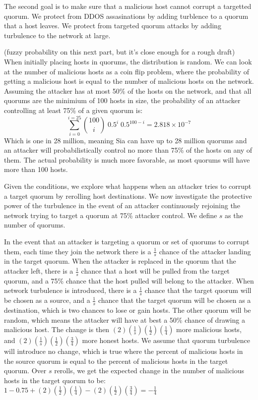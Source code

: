 \documentclass[twocolumn]{article}
\begin{document}
The second goal is to make sure that a malicious host cannot corrupt a targetted quorum.
We protect from DDOS assasinations by adding turblence to a quorum that a host leaves.
We protect from targeted quorum attacks by adding turbulence to the network at large.

(fuzzy probability on this next part, but it's close enough for a rough draft)
When initially placing hosts in quorums, the distribution is random.
We can look at the number of malicious hosts as a coin flip problem, where the probability of getting a malicious host is equal to the number of malicious hosts on the network.
Assuming the attacker has at most 50\% of the hosts on the network, and that all quorums are the minimium of 100 hosts in size, the probability of an attacker controlling at least 75\% of a given quorum is:
\begin{equation}
\sum_{i=0}^{i=25} {100 \choose i} \; 0.5^{i} \; 0.5^{100-i} = 2.818\times10^{-7}
\end{equation}
Which is one in 28 million, meaning Sia can have up to 28 million quorums and an attacker will probabilistically control no more than 75\% of the hosts on any of them.
The actual probability is much more favorable, as most quorums will have more than 100 hosts.

Given the conditions, we explore what happens when an attacker tries to corrupt a target quorum by rerolling host destinations.
We now investigate the protective power of the turbulence in the event of an attacker continuously rejoining the network trying to target a quorum at 75\% attacker control.
We define $s$ as the number of quorums.

In the event that an attacker is targeting a quorum or set of quorums to corrupt them, each time they join the network there is a $\frac{1}{s}$ chance of the attacker landing in the target quorum.
When the attacker is replaced in the quorum that the attacker left, there is a $\frac{1}{s}$ chance that a host will be pulled from the target quorum, and a 75\% chance that the host pulled will belong to the attacker.
When network turbulence is introduced, there is a $\frac{1}{s}$ chance that the target quorum will be chosen as a source, and a $\frac{1}{s}$ chance that the target quorum will be chosen as a destination, which is two chances to lose or gain hosts.
The other quorum will be random, which means the attacker will have at best a 50\% chance of drawing a malicious host.
The change is then $(2)(\frac{1}{s})(\frac{1}{2})(\frac{1}{4})$ more malicious hosts, and $(2)(\frac{1}{s})(\frac{1}{2})(\frac{3}{4})$ more honest hosts.
We assume that quorum turbulence will introduce no change, which is true where the percent of malicious hosts in the source quorum is equal to the percent of malicious hosts in the target quorum.
Over $s$ rerolls, we get the expected change in the number of malicious hosts in the target quorum to be:
$1 - 0.75 + (2)(\frac{1}{2})(\frac{1}{4}) - (2)(\frac{1}{2})(\frac{3}{4}) = -\frac{1}{4}$
\end{document}
